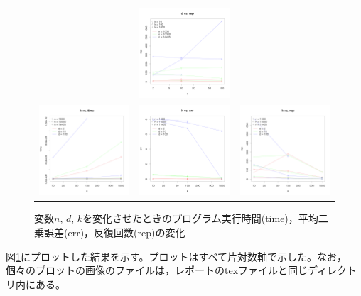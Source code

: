 \documentclass[10pt,a4,uplatex]{jsarticle}
\begin{document}
\begin{figure}[!htbp]
\begin{tabular}{ccc}
      &
      \includegraphics[width=0.33\hsize]{./d_rep.pdf}
    \\
      \includegraphics[width=0.33\hsize]{./k_time.pdf}
      &
      \includegraphics[width=0.33\hsize]{./k_err.pdf}
      &
      \includegraphics[width=0.33\hsize]{./k_rep.pdf}
  \end{tabular}
  \caption{変数$n$, $d$, $k$を変化させたときのプログラム実行時間(time)，平均二乗誤差(err)，反復回数(rep)の変化}\label{fig:plot_all}
\end{figure}

図\ref{fig:plot_all}にプロットした結果を示す。プロットはすべて片対数軸で示した。なお，個々のプロットの画像のファイルは，レポートのtexファイルと同じディレクトリ内にある。
\end{document}
